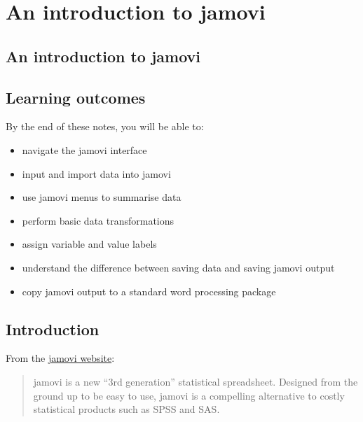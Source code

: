 \documentclass[
  a4paper,
]{memoir}
\providecommand{\tightlist}{%
  \setlength{\itemsep}{0pt}\setlength{\parskip}{0pt}}
\begin{document}
\newpage{}


\chapter*{An introduction to jamovi}\label{an-introduction-to-jamovi}


\section{An introduction to jamovi}\label{an-introduction-to-jamovi-1}

\section*{Learning outcomes}\label{learning-outcomes-1}


By the end of these notes, you will be able to:

\begin{itemize}
\tightlist
\item
  navigate the jamovi interface
\item
  input and import data into jamovi
\item
  use jamovi menus to summarise data
\item
  perform basic data transformations
\item
  assign variable and value labels
\item
  understand the difference between saving data and saving jamovi output
\item
  copy jamovi output to a standard word processing package
\end{itemize}

\section{Introduction}\label{introduction}

From the \href{https://www.jamovi.org/}{jamovi website}:

\begin{quote}
jamovi is a new ``3rd generation'' statistical spreadsheet. Designed
from the ground up to be easy to use, jamovi is a compelling alternative
to costly statistical products such as SPSS and SAS.
\end{quote}
\end{document}
